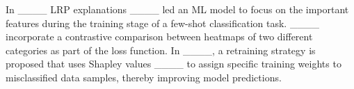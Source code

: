 
%

%
%
In ____ LRP explanations ____ led an ML model to focus on the important features during the training stage of a few-shot classification task. %
% 
____ incorporate a contrastive comparison between heatmaps of two different categories as part of the loss function. %
%
In ____, a retraining strategy is proposed that uses Shapley values ____ to assign specific training weights to misclassified data samples, thereby improving model predictions. %

